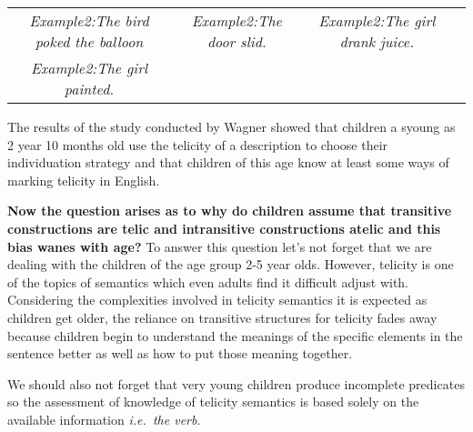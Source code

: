 \documentclass[11pt]{article}
\begin{document}
\begin{longtable}[]{@{}cccc@{}}
\begin{minipage}[t]{0.25\columnwidth}
\emph{Example2:The bird poked the balloon}\strut
\end{minipage} & \begin{minipage}[t]{0.23\columnwidth}\centering
\emph{Example2:The door slid.}\strut
\end{minipage} & \begin{minipage}[t]{0.25\columnwidth}\centering
\emph{Example2:The girl drank juice.}\strut
\end{minipage}\tabularnewline
\begin{minipage}[t]{0.16\columnwidth}\centering
\emph{Example2:The girl painted.}\strut
\end{minipage} & \begin{minipage}[t]{0.25\columnwidth}\centering
\strut
\end{minipage} & \begin{minipage}[t]{0.23\columnwidth}\centering
\strut
\end{minipage} & \begin{minipage}[t]{0.25\columnwidth}\centering
\strut
\end{minipage}\tabularnewline
\bottomrule
\end{longtable}

    The results of the study conducted by Wagner showed that children a
syoung as 2 year 10 months old use the telicity of a description to
choose their individuation strategy and that children of this age know
at least some ways of marking telicity in English.

\textbf{Now the question arises as to why do children assume that
transitive constructions are telic and intransitive constructions atelic
and this bias wanes with age?} To answer this question let's not forget
that we are dealing with the children of the age group 2-5 year olds.
However, telicity is one of the topics of semantics which even adults
find it difficult adjust with. Considering the complexities involved in
telicity semantics it is expected as children get older, the reliance on
transitive structures for telicity fades away because children begin to
understand the meanings of the specific elements in the sentence better
as well as how to put those meaning together.

We should also not forget that very young children produce incomplete
predicates so the assessment of knowledge of telicity semantics is based
solely on the available information \emph{i.e.~the verb}.
\end{document}
